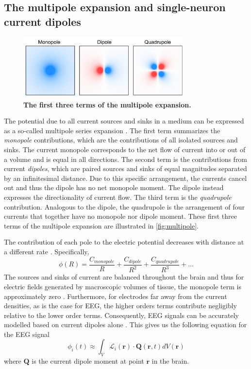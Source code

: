 \subsection{The multipole expansion and single-neuron current dipoles} \label{sec:dipoles}

\begin{figure}
\vspace{-17pt}
\centering
\includegraphics[width=88mm]{Figures/chapter1/multipole_expansion.pdf}
\vspace{-22pt}
\caption{\textbf{The first three terms of the multipole expansion.}}  \label{fig:multipole}
\end{figure}

The potential due to all current sources and sinks in a medium can be expressed as a so-called multipole series expansion \cite{Nunez2006}. The first term summarizes the \textit{monopole} contributions, which are the contributions of all isolated sources and sinks. The current monopole corresponds to the net flow of current into or out of a volume and is equal in all directions. The second term is the contributions from current \textit{dipoles}, which are paired sources and sinks of equal magnitudes separated by an infinitesimal distance. Due to this specific arrangement, the currents cancel out and thus the dipole has no net monopole moment. The dipole instead expresses the directionality of current flow. The third term is the \textit{quadrupole} contribution. Analogous to the dipole, the quadrupole is the arrangement of four currents that together have no monopole nor dipole moment. These first three terms of the multipole expansion are illustrated in \autoref{fig:multipole}. 

The contribution of each pole to the electric potential decreases with distance at a different rate \cite{Nunez2006}. Specifically,
\begin{equation*}
    \phi(R) = \frac{C_{monopole}}{R} + \frac{C_{dipole}}{R^2}  + \frac{C_{quadrupole}}{R^3}  + \dots
\end{equation*}
The sources and sinks of current are balanced throughout the brain and thus for electric fields generated by macroscopic volumes of tissue, the monopole term is approximately zero \cite{Nunez2006}. Furthermore, for electrodes far away from the current densities, as is the case for EEG, the higher orders terms contribute negligibly relative to the lower order terms. Consequently, EEG signals can be accurately modelled based on current dipoles alone \cite{Nunez2006,RevModPhys.65.413}. This gives us the following equation for the EEG signal \cite{RevModPhys.65.413}
\begin{equation} \label{eq:lead_solution}
    \phi_i(t) \approx \int_V \mathcal{L}_i(\bm{r}) \cdot \bm{Q}(\bm{r},t) dV(\bm{r})
\end{equation}
where $\bm{Q}$ is the current dipole moment at point $\bm{r}$ in the brain. 

